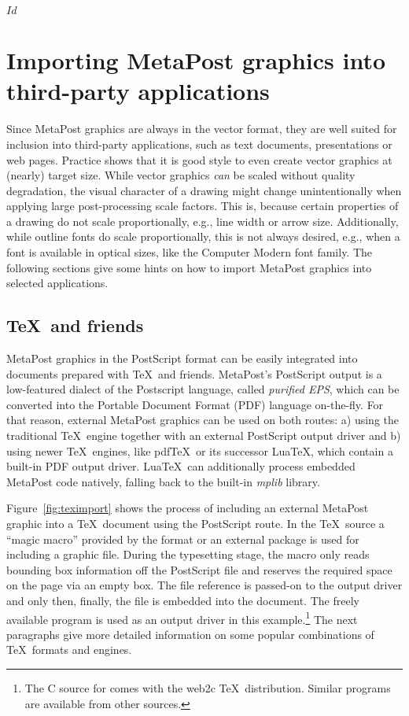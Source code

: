 \svnInfo $Id$
\section{Importing MetaPost graphics into third-party applications}
\label{mpimport}

Since MetaPost graphics are always in the vector format, they are well
suited for inclusion into third-party applications, such as text
documents, presentations or web pages.  Practice shows that it is good
style to even create vector graphics at (nearly) target size.  While
vector graphics \emph{can} be scaled without quality degradation, the
visual character of a drawing might change unintentionally when applying
large post-processing scale factors.  This is, because certain
properties of a drawing do not scale proportionally, e.g., line width or
arrow size.  Additionally, while outline fonts do scale proportionally,
this is not always desired, e.g., when a font is available in optical
sizes, like the Computer Modern font family.  The following sections
give some hints on how to import MetaPost graphics into selected
applications.

\subsection{\TeX\ and friends}
\label{teximport}

MetaPost graphics in the PostScript format can be
easily integrated into documents prepared with \TeX\ and friends.
MetaPost's PostScript output is a low-featured dialect of the Postscript
language, called \emph{purified EPS}, which can be
converted into the Portable Document Format (PDF) language
on-the-fly.  For that reason, external MetaPost graphics can be used on
both routes: a) using the traditional \TeX\ engine together with an
external PostScript output driver and b) using newer \TeX\ engines, like
pdf\TeX\ or its successor Lua\TeX, which contain a built-in PDF output
driver.  Lua\TeX\ can additionally process embedded MetaPost code
natively, falling back to the built-in \emph{mplib} library.

Figure~\ref{fig:teximport} shows the process of including an external
MetaPost graphic into a \TeX\ document using the PostScript route.  In
the \TeX\ source a ``magic macro'' provided by the format or an external
package is used for including a graphic file.  During the typesetting
stage, the macro only reads bounding box information off the PostScript
file and reserves the required space on the page via an empty box.  The
file reference is passed-on to the output driver and only then, finally,
the file is embedded into the document.  The freely available program
 is used as an output driver in this
example.\footnote{The C source for  comes with the web2c
  \TeX\ distribution.  Similar programs are available from other
  sources.}  The next paragraphs give more detailed information on some
popular combinations of \TeX\ formats and engines.

